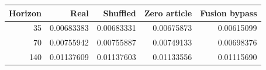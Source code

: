\begin{tabular}{rrrrr}
\toprule
Horizon & Real & Shuffled & Zero article & Fusion bypass \\
\midrule
35 & 0.00683383 & 0.00683331 & 0.00675873 & 0.00615099 \\
70 & 0.00755942 & 0.00755887 & 0.00749133 & 0.00698376 \\
140 & 0.01137609 & 0.01137603 & 0.01133556 & 0.01115690 \\
\bottomrule
\end{tabular}
